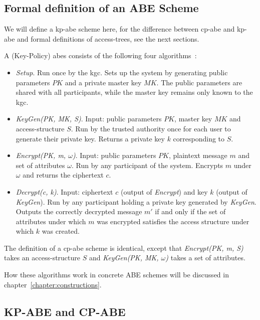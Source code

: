 \subsection{Formal definition of an ABE Scheme}\label{sec:definition-es}

We will define a \acrshort{kp-abe} scheme here, for the difference between \acrshort{cp-abe} and \acrshort{kp-abe} and formal definitions of \glspl{access-tree}, see the next sections.

\begin{definition}
    A (Key-Policy) \Acrlong{abes} consists of the following four algorithms~\cite{goyal_attribute-based_2006}:
    \begin{itemize}
        \item \emph{Setup}. Run once by the \acrfull{kgc}. Sets up the system by generating public parameters $PK$ and a private master key $MK$. The public parameters are shared with all participants, while the master key remains only known to the \acrshort{kgc}.
        \item \emph{KeyGen(PK, MK, S)}. Input: public parameters $PK$, master key $MK$ and \gls{access-structure} $S$.
        Run by the trusted authority once for each user to generate their private key. Returns a private key $k$ corresponding to $S$.
        \item \emph{Encrypt(PK, m, $\omega$)}. Input: public parameters $PK$, plaintext message $m$ and set of attributes $\omega$.
        Run by any participant of the system. Encrypts $m$ under $\omega$ and returns the ciphertext $c$.
        \item \emph{Decrypt(c, k)}. Input: ciphertext $c$ (output of \emph{Encrypt}) and key $k$ (output of \emph{KeyGen}).
        Run by any participant holding a private key generated by \emph{KeyGen}. Outputs the correctly decrypted message $m'$ if and only if the set of attributes under which $m$ was encrypted satisfies the access structure under which $k$ was created.
    \end{itemize}
\end{definition}

The definition of a \acrshort{cp-abe} scheme is identical, except that \emph{Encrypt(PK, m, S)} takes an \gls{access-structure} $S$ and \emph{KeyGen(PK, MK, $\omega$)} takes a set of attributes.

How these algorithms work in concrete ABE schemes will be discussed in chapter~\ref{chapter:constructions}.

\subsection{KP-ABE and CP-ABE}\label{sec:cp-vs-kp}



